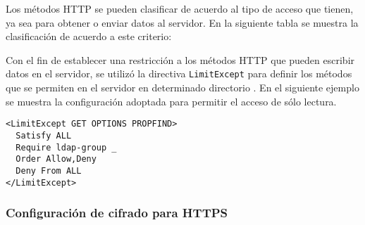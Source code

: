 Los m\'{e}todos \textsc{HTTP} se pueden clasificar de acuerdo al tipo de acceso que tienen, ya sea para obtener o enviar datos al servidor. En la siguiente tabla se muestra la clasificaci\'{o}n de acuerdo a este criterio:

{
 \linespread{1}
 \begin{table}[H]
 \caption{Clasificaci\'{o}n de m\'{e}todos \textsc{HTTP}}{}
 \label{tab:http-methods}
 \noindent{} %
 \end{table}
}

Con el fin de establecer una restricci\'{o}n a los m\'{e}todos \textsc{HTTP} que pueden escribir datos en el servidor, se utiliz\'{o} la directiva \texttt{LimitExcept} para definir los m\'{e}todos que se permiten en el servidor en determinado directorio \cite{_core_????}. En el siguiente ejemplo se muestra la configuraci\'{o}n adoptada para permitir el acceso de s\'{o}lo lectura.

{
\scriptsize
\linespread{1}
\begin{verbatim}
<LimitExcept GET OPTIONS PROPFIND>
  Satisfy ALL
  Require ldap-group _
  Order Allow,Deny
  Deny From ALL
</LimitExcept>
\end{verbatim}
}

        \subsubsection{Configuraci\'{o}n de cifrado para \textsc{HTTPS}}

